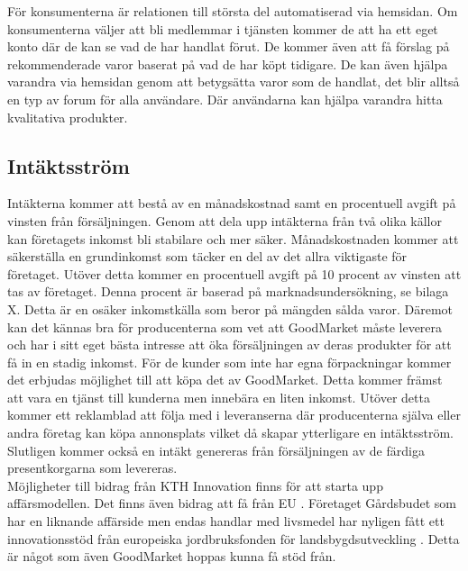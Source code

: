 \documentclass[10pt,a4paper,oneside]{article}
\begin{document}
För konsumenterna är relationen till största del automatiserad via hemsidan. Om konsumenterna väljer att bli medlemmar i tjänsten kommer de att ha ett eget konto där de kan se vad de har handlat förut. De kommer även att få förslag på rekommenderade varor baserat på vad de har köpt tidigare. De kan även hjälpa varandra via hemsidan genom att betygsätta varor som de handlat, det blir alltså en typ av forum för alla användare. Där användarna kan hjälpa varandra hitta kvalitativa produkter. 


\subsection{Intäktsström}
Intäkterna kommer att bestå av en månadskostnad samt en procentuell avgift på vinsten från försäljningen. Genom att dela upp intäkterna från två olika källor kan företagets inkomst bli stabilare och mer säker. Månadskostnaden kommer att säkerställa en grundinkomst som täcker en del av det allra viktigaste för företaget. Utöver detta kommer en procentuell avgift på 10 procent av vinsten att tas av företaget. Denna procent är baserad på marknadsundersökning, se bilaga X. Detta är en osäker inkomstkälla som beror på mängden sålda varor. Däremot kan det kännas bra för producenterna som vet att GoodMarket måste leverera och har i sitt eget bästa intresse att öka försäljningen av deras produkter för att få in en stadig inkomst. För de kunder som inte har egna förpackningar kommer det erbjudas möjlighet till att köpa det av GoodMarket. Detta kommer främst att vara en tjänst till kunderna men innebära en liten inkomst. Utöver detta kommer ett reklamblad att följa med i leveranserna där producenterna själva eller andra företag kan köpa annonsplats vilket då skapar ytterligare en intäktsström. Slutligen kommer också en intäkt genereras från försäljningen av de färdiga presentkorgarna som levereras. \\

Möjligheter till bidrag från KTH Innovation finns för att starta upp affärsmodellen. Det finns även bidrag att få från EU \cite{EU}. Företaget Gårdsbudet som har en liknande affärside men endas handlar med livsmedel har nyligen fått ett innovationsstöd från europeiska jordbruksfonden för landsbygdsutveckling \cite{GB4}. Detta är något som även GoodMarket hoppas kunna få stöd från.  
\end{document}
